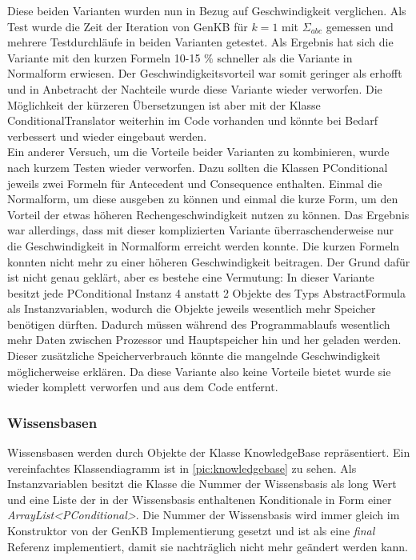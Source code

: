 \documentclass[12pt,a4paper]{article}
\begin{document}
Diese beiden Varianten wurden nun in Bezug auf Geschwindigkeit verglichen. Als Test wurde die Zeit der Iteration von GenKB für $k=1$ mit $\Sigma_{abc}$ gemessen und mehrere Testdurchläufe in beiden Varianten getestet. Als Ergebnis hat sich die Variante mit den kurzen Formeln 10-15 $\%$ schneller als die Variante in Normalform erwiesen. Der Geschwindigkeitsvorteil war somit geringer als erhofft und in Anbetracht der Nachteile wurde diese Variante wieder verworfen. Die Möglichkeit der kürzeren Übersetzungen ist aber mit der Klasse ConditionalTranslator weiterhin im Code vorhanden und könnte bei Bedarf verbessert und wieder eingebaut werden. \\
Ein anderer Versuch, um die Vorteile beider Varianten zu kombinieren, wurde nach kurzem Testen wieder verworfen. Dazu sollten die Klassen PConditional jeweils zwei Formeln für Antecedent und Consequence enthalten. Einmal die Normalform, um diese ausgeben zu können und einmal die kurze Form, um den Vorteil der etwas höheren Rechengeschwindigkeit nutzen zu können. Das Ergebnis war allerdings, dass mit dieser komplizierten Variante überraschenderweise nur die Geschwindigkeit in Normalform erreicht werden konnte. Die kurzen Formeln konnten nicht mehr zu einer höheren Geschwindigkeit beitragen. Der Grund dafür ist nicht genau geklärt, aber es bestehe eine Vermutung: In dieser Variante besitzt jede PConditional Instanz 4 anstatt 2 Objekte des Typs AbstractFormula als Instanzvariablen, wodurch die Objekte jeweils wesentlich mehr Speicher benötigen dürften. Dadurch müssen während des Programmablaufs wesentlich mehr Daten zwischen Prozessor und Hauptspeicher hin und her geladen werden. Dieser zusätzliche Speicherverbrauch könnte die mangelnde Geschwindigkeit möglicherweise erklären. Da diese Variante also keine Vorteile bietet wurde sie wieder komplett verworfen und aus dem Code entfernt.


\subsubsection{Wissensbasen}




Wissensbasen werden durch Objekte der Klasse KnowledgeBase repräsentiert. Ein vereinfachtes Klassendiagramm ist in \autoref{pic:knowledgebase} zu sehen. Als Instanzvariablen besitzt die Klasse die Nummer der Wissensbasis als long Wert und eine Liste der in der Wissensbasis enthaltenen Konditionale in Form einer \textit{ArrayList<PConditional>}. Die Nummer der Wissensbasis wird immer gleich im Konstruktor von der GenKB Implementierung gesetzt und ist als eine \textit{final} Referenz implementiert, damit sie nachträglich nicht mehr geändert werden kann.
\end{document}

